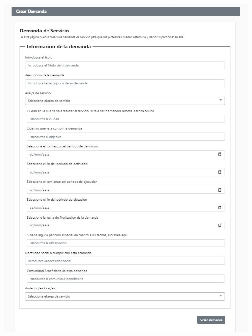 \documentclass[11pt]{article}
\begin{document}
\includegraphics[width=\textwidth]{demanda}
\\\\
\end{document}
